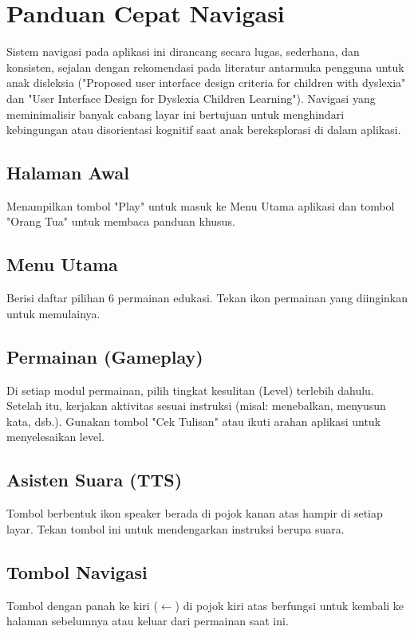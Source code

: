 \documentclass[12pt,a4paper]{report}
\begin{document}

\chapter{Panduan Cepat Navigasi}

Sistem navigasi pada aplikasi ini dirancang secara lugas, sederhana, dan konsisten, sejalan dengan rekomendasi pada literatur antarmuka pengguna untuk anak disleksia ("Proposed user interface design criteria for children with dyslexia" dan "User Interface Design for Dyslexia Children Learning"). Navigasi yang meminimalisir banyak cabang layar ini bertujuan untuk menghindari kebingungan atau disorientasi kognitif saat anak bereksplorasi di dalam aplikasi.

\section{Halaman Awal}
Menampilkan tombol "Play" untuk masuk ke Menu Utama aplikasi dan tombol "Orang Tua" untuk membaca panduan khusus.

\section{Menu Utama}
Berisi daftar pilihan 6 permainan edukasi. Tekan ikon permainan yang diinginkan untuk memulainya.

\section{Permainan (Gameplay)}
Di setiap modul permainan, pilih tingkat kesulitan (Level) terlebih dahulu. Setelah itu, kerjakan aktivitas sesuai instruksi (misal: menebalkan, menyusun kata, dsb.). Gunakan tombol "Cek Tulisan" atau ikuti arahan aplikasi untuk menyelesaikan level.

\section{Asisten Suara (TTS)}
Tombol berbentuk ikon speaker berada di pojok kanan atas hampir di setiap layar. Tekan tombol ini untuk mendengarkan instruksi berupa suara.

\section{Tombol Navigasi}
Tombol dengan panah ke kiri ($\leftarrow$) di pojok kiri atas berfungsi untuk kembali ke halaman sebelumnya atau keluar dari permainan saat ini.

\end{document}
